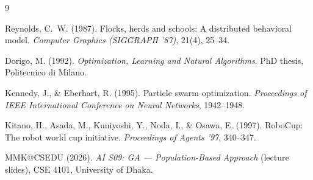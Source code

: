 \documentclass[11pt,a4paper]{article}
\begin{document}
\begin{thebibliography}{9}

Reynolds, C.~W. (1987). Flocks, herds and schools: A distributed behavioral model.
\emph{Computer Graphics (SIGGRAPH '87)}, 21(4), 25--34.

Dorigo, M. (1992). \emph{Optimization, Learning and Natural Algorithms}.
PhD thesis, Politecnico di Milano.

Kennedy, J., \& Eberhart, R. (1995). Particle swarm optimization.
\emph{Proceedings of IEEE International Conference on Neural Networks}, 1942--1948.

Kitano, H., Asada, M., Kuniyoshi, Y., Noda, I., \& Osawa, E. (1997).
RoboCup: The robot world cup initiative. \emph{Proceedings of Agents '97}, 340--347.

MMK@CSEDU (2026). \emph{AI S09: GA --- Population-Based Approach} (lecture slides),
CSE 4101, University of Dhaka.

\end{thebibliography}
\end{document}
